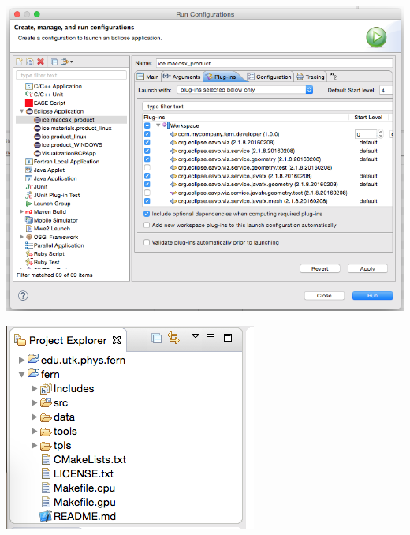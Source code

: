 \documentclass{article}
\begin{document}
\begin{center}
\includegraphics[width=\textwidth]{figures/launch.png}
\label{fig:launch}
\end{center}

\begin{center}
\includegraphics[width=\textwidth]{figures/result.png}
\label{fig:result}
\end{center}
\end{document}
